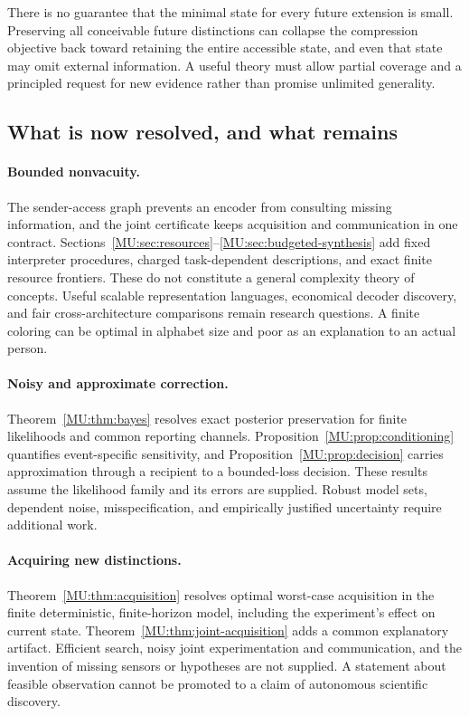 There is no guarantee that the minimal state for every future extension is small. Preserving all conceivable future distinctions can collapse the compression objective back toward retaining the entire accessible state, and even that state may omit external information. A useful theory must allow partial coverage and a principled request for new evidence rather than promise unlimited generality.

\subsection{What is now resolved, and what remains}
\paragraph{Bounded nonvacuity.}
The sender-access graph prevents an encoder from consulting missing information, and the joint certificate keeps acquisition and communication in one contract. Sections~\ref{MU:sec:resources}--\ref{MU:sec:budgeted-synthesis} add fixed interpreter procedures, charged task-dependent descriptions, and exact finite resource frontiers. These do not constitute a general complexity theory of concepts. Useful scalable representation languages, economical decoder discovery, and fair cross-architecture comparisons remain research questions. A finite coloring can be optimal in alphabet size and poor as an explanation to an actual person.

\paragraph{Noisy and approximate correction.}
Theorem~\ref{MU:thm:bayes} resolves exact posterior preservation for finite likelihoods and common reporting channels. Proposition~\ref{MU:prop:conditioning} quantifies event-specific sensitivity, and Proposition~\ref{MU:prop:decision} carries approximation through a recipient to a bounded-loss decision. These results assume the likelihood family and its errors are supplied. Robust model sets, dependent noise, misspecification, and empirically justified uncertainty require additional work.

\paragraph{Acquiring new distinctions.}
Theorem~\ref{MU:thm:acquisition} resolves optimal worst-case acquisition in the finite deterministic, finite-horizon model, including the experiment's effect on current state. Theorem~\ref{MU:thm:joint-acquisition} adds a common explanatory artifact. Efficient search, noisy joint experimentation and communication, and the invention of missing sensors or hypotheses are not supplied. A statement about feasible observation cannot be promoted to a claim of autonomous scientific discovery.

